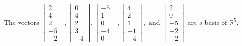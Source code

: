 \begin{exercise}
\begin{exerciseStatement}
  \end{exerciseStatement}
  \begin{exerciseAnswer}
   The vectors \(\left[\begin{array}{r}
2 \\
4 \\
2 \\
-5 \\
-2
\end{array}\right] , \left[\begin{array}{r}
0 \\
4 \\
2 \\
3 \\
-4
\end{array}\right] , \left[\begin{array}{r}
-5 \\
1 \\
0 \\
-4 \\
0
\end{array}\right] , \left[\begin{array}{r}
4 \\
2 \\
1 \\
-1 \\
-4
\end{array}\right] , \text{ and } \left[\begin{array}{r}
2 \\
0 \\
-5 \\
-2 \\
-2
\end{array}\right]\) 
  	 are  a basis of \(\mathbb{R}^5\).
  


  \end{exerciseAnswer}
\end{exercise}